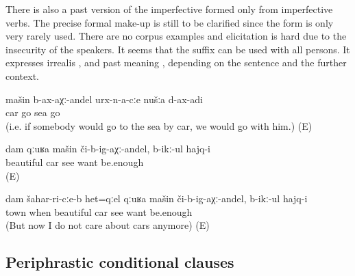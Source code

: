 There is also a past version of the imperfective  formed only from imperfective verbs. The precise formal make-up is still to be clarified since the form is only very rarely used. There are no corpus examples and elicitation is hard due to the insecurity of the speakers. It seems that the suffix  can be used with all persons. It expresses irrealis  ,  and past  meaning , depending on the sentence and the further context.
%
\begin{exe}
	\ex	\label{ex:‎‎‎If a car would go to the sea, we would go.}
	\gll	mašin	b-ax-aχː-andel	urx-n-a-cːe	nušːa	d-ax-adi\\
		car	go	sea		go\\
	\glt	{} (i.e. if somebody would go to the sea by car, we would go with him.) (E) 

	\ex	\label{ex:If I would see a nice car, I would want it.}
	\gll	dam	qːuʁa	mašin	či-b-ig-aχː-andel,	b-ikː-ul	hajq-i\\
			beautiful	car	see	want	be.enough\\
	\glt	{}  (E)

	\ex	\label{ex:At that time when I saw a nice car in the city, I wanted it.}
	\gll	dam	šahar-ri-cːe-b	het=qːel qːuʁa	mašin	či-b-ig-aχː-andel,	b-ikː-ul	hajq-i\\
			town when beautiful	car	see	want	be.enough\\
	\glt	{} (But now I do not care about cars anymore) (E)
\end{exe}



\subsection{Periphrastic conditional clauses}
\label{sec:periphrasticconditionalclauses}

